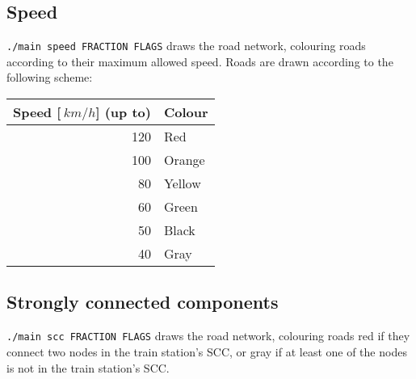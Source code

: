 \subsection{Speed}
\texttt{./main speed FRACTION FLAGS} draws the road network, colouring roads according to their maximum allowed speed. Roads are drawn according to the following scheme:
\begin{center}
    \begin{tabular}{r | l}
        \textbf{Speed [$\SI{}{km/h}$] (up to)} & \textbf{Colour} \\ \hline
                                  120 & Red             \\
                                  100 & Orange          \\
                                   80 & Yellow          \\
                                   60 & Green           \\
                                   50 & Black           \\
                                   40 & Gray            
    \end{tabular}
\end{center}
\subsection{Strongly connected components}
\texttt{./main scc FRACTION FLAGS} draws the road network, colouring roads red if they connect two nodes in the train station's \acrshort{SCC}, or gray if at least one of the nodes is not in the train station's \acrshort{SCC}.
